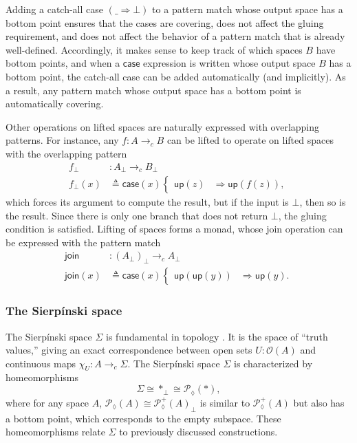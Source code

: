 \documentclass[conference]{IEEEtran}
\newcommand{\PLower}{\mathcal{P}_\lozenge}
\newcommand{\cto}{\to_c}
\newcommand{\One}{\ast}
\newcommand{\Open}[1]{\mathcal{O}({#1})}
\newcommand{\wildcard}{\_}
\newcommand{\Branch}{\Rightarrow}
\newcommand{\up}{\mathsf{up}}
\begin{document}
Adding a catch-all case $(\wildcard \Branch \bot)$ to a pattern match whose output space has a bottom point ensures that the cases are covering, does not affect the gluing requirement, and does not affect the behavior of a pattern match that is already well-defined. Accordingly, it makes sense to keep track of which spaces $B$ have bottom points, and when a $\mathsf{case}$ expression is written whose output space $B$ has a bottom point, the catch-all case can be added automatically (and implicitly). As a result, any pattern match whose output space has a bottom point is automatically covering.

Other operations on lifted spaces are naturally expressed with overlapping patterns. For instance, any $f : A \cto B$ can be lifted to operate on lifted spaces with the overlapping pattern
\begin{align*}
f_\bot &: A_\bot \cto B_\bot
\\ f_\bot(x) &\triangleq
  \mathsf{case}(x)
  \begin{cases}
  \up(z) &\Branch \up(f(z)),
  \end{cases}
\end{align*}
which forces its argument to compute the result, but if the input is $\bot$, then so is the result. Since there is only one branch that does not return $\bot$, the gluing condition is satisfied. Lifting of spaces forms a monad, whose join operation can be expressed with the pattern match
\begin{align*}
\mathsf{join} &: \left( A_\bot \right)_\bot \cto A_\bot
\\ \mathsf{join}(x) &\triangleq \mathsf{case}(x)
\begin{cases}
\up(\up(y)) &\Branch \up(y).
\end{cases}
\end{align*}

\subsubsection{The Sierp\'inski space}

The Sierp\'inski space $\Sigma$ is fundamental in topology \cite{escardo2004}. It is the space of ``truth values,'' giving an exact correspondence between open sets $U : \Open{A}$ and continuous maps $\chi_U : A \cto \Sigma$. The Sierp\'inski space $\Sigma$ is characterized by homeomorphisms
\[
\Sigma \cong \One_\bot \cong \PLower(\One) ,
\]
where for any space $A$, $\PLower(A) \cong {\PLower^+(A)}_\bot$ is similar to $\PLower^+(A)$ but also has a bottom point, which corresponds to the empty subspace. These homeomorphisms relate $\Sigma$ to previously discussed constructions.
\end{document}
